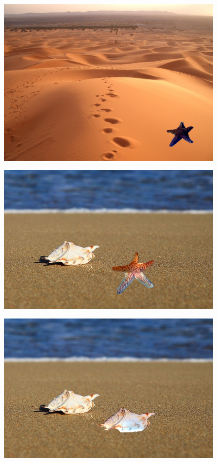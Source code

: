 \documentclass[oneside]{article}
\begin{document}
\begin{figure}[htbp]
\centering
\includegraphics[width=1\textwidth]{./img/mix_dest_desert_estrella}
\caption{}
\label{fig:1}
\end{figure}

\begin{figure}[htbp]
\centering
\includegraphics[width=1\textwidth]{./img/mix_dest_sand_estrella2.jpg}
\caption{}
\label{fig:2}
\end{figure}

\begin{figure}[htbp]
\centering
\includegraphics[width=1\textwidth]{./img/mix_dest_sand_shell2.jpg}
\caption{}
\label{fig:3}
\end{figure}
\end{document}
